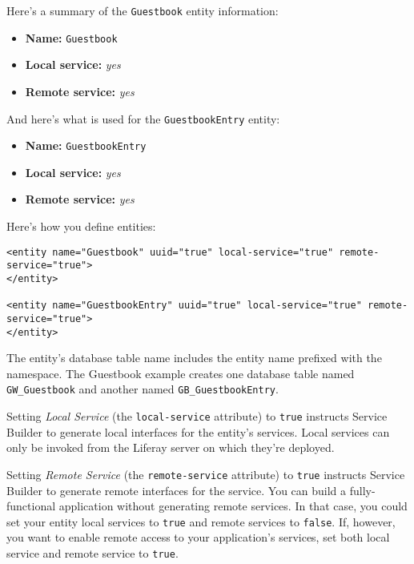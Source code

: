Here's a summary of the \texttt{Guestbook} entity information:

\begin{itemize}
\tightlist
\item
  \textbf{Name:} \texttt{Guestbook}
\item
  \textbf{Local service:} \emph{yes}
\item
  \textbf{Remote service:} \emph{yes}
\end{itemize}

And here's what is used for the \texttt{GuestbookEntry} entity:

\begin{itemize}
\tightlist
\item
  \textbf{Name:} \texttt{GuestbookEntry}
\item
  \textbf{Local service:} \emph{yes}
\item
  \textbf{Remote service:} \emph{yes}
\end{itemize}

Here's how you define entities:

\begin{verbatim}
<entity name="Guestbook" uuid="true" local-service="true" remote-service="true">
</entity>

<entity name="GuestbookEntry" uuid="true" local-service="true" remote-service="true">
</entity>
\end{verbatim}

The entity's database table name includes the entity name prefixed with
the namespace. The Guestbook example creates one database table named
\texttt{GW\_Guestbook} and another named \texttt{GB\_GuestbookEntry}.

Setting \emph{Local Service} (the \texttt{local-service} attribute) to
\texttt{true} instructs Service Builder to generate local interfaces for
the entity's services. Local services can only be invoked from the
Liferay server on which they're deployed.

Setting \emph{Remote Service} (the \texttt{remote-service} attribute) to
\texttt{true} instructs Service Builder to generate remote interfaces
for the service. You can build a fully-functional application without
generating remote services. In that case, you could set your entity
local services to \texttt{true} and remote services to \texttt{false}.
If, however, you want to enable remote access to your application's
services, set both local service and remote service to \texttt{true}.

\noindent\hrulefill

